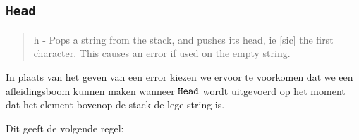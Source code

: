 \subsection{\texttt{Head}}
\label{sec:rules:head}

\begin{quote}
	h - Pops a string from the stack, and pushes its head, ie [sic] the first
	character. This causes an error if used on the empty string.
\end{quote}

In plaats van het geven van een error kiezen we ervoor te voorkomen dat we een
afleidingsboom kunnen maken wanneer $\texttt{Head}$ wordt uitgevoerd op het moment
dat het element bovenop de stack de lege string is.

Dit geeft de volgende regel:
\therheadns%
